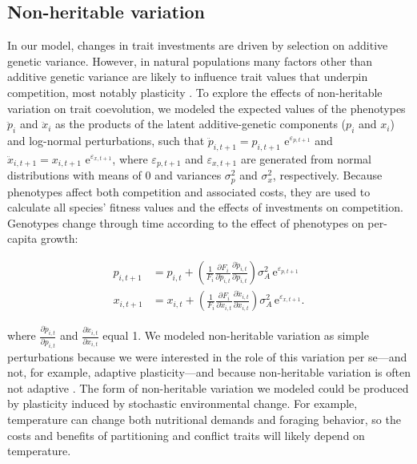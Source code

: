 \subsection*{Non-heritable variation}

In our model, changes in trait investments are driven by selection on
additive genetic variance. However, in natural populations many factors other
than additive genetic variance are likely to influence trait values that
underpin competition, most notably plasticity \citep{Miner2005}.
To explore the effects of non-heritable variation on trait coevolution, we
modeled the expected values of the phenotypes ${\ddot{p}}_{i}$ and
${\ddot{x}}_{i}$ as the products of the latent additive-genetic
components ($p_{i}$ and $x_{i}$) and log-normal perturbations, such
that
${\ddot{p}}_{i,t + 1} = p_{i,t + 1}\mspace{6mu}\text{e}^{\varepsilon_{p,t + 1}}$
and
${\ddot{x}}_{i,t + 1} = x_{i,t + 1}\mspace{6mu}\text{e}^{\varepsilon_{x,t + 1}}$,
where $\varepsilon_{p,t + 1}$ and $\varepsilon_{x,t + 1}$ are
generated from normal distributions with means of 0 and variances
$\sigma_{p}^{2}$ and $\sigma_{x}^{2}$, respectively. Because
phenotypes affect both competition and associated costs, they are used
to calculate all species' fitness values and the effects of investments
on competition. Genotypes change through time according to the effect of
phenotypes on per-capita growth:


\begin{equation} \label{eq:invest-change-non-heritable}
\begin{split}
    p_{i,t+1} &= p_{i,t} + \left( \frac{1}{F_i}
            \frac{\partial F_i}{\partial \ddot{p}_{i,t}}
            \frac{\partial \ddot{p}_{i,t}}{\partial {p}_{i,t}}
        \right) \sigma^2_A \, \text{e}^{\varepsilon_{p,t+1}} \\
    x_{i,t+1} &= x_{i,t} + \left( \frac{1}{F_i}
            \frac{\partial F_i}{\partial \ddot{x}_{i,t}} 
            \frac{\partial \ddot{x}_{i,t}}{\partial {x}_{i,t}} 
        \right) \sigma^2_A \, \text{e}^{\varepsilon_{x,t+1}}
    \textrm{.}
\end{split}
\end{equation}

where $\frac{\partial{\ddot{p}}_{i,t}}{\partial p_{i,t}}$ and
$\frac{\partial{\ddot{x}}_{i,t}}{\partial x_{i,t}}$ equal 1. We
modeled non-heritable variation as simple perturbations because we were
interested in the role of this variation per se---and not, for example,
adaptive plasticity---and because non-heritable variation is often not
adaptive \citep{Ghalambor2007, Miner2005}. The form of
non-heritable variation we modeled could be produced by plasticity induced
by stochastic environmental change. For example, temperature can change
both nutritional demands and foraging behavior, so the costs and
benefits of partitioning and conflict traits will likely depend on
temperature.

